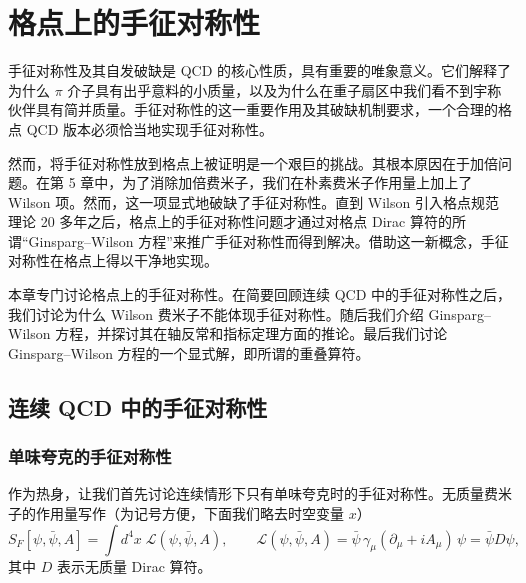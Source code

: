 
\chapter{格点上的手征对称性}

手征对称性及其自发破缺是 QCD 的核心性质，具有重要的唯象意义。它们解释了为什么 $\pi$ 介子具有出乎意料的小质量，以及为什么在重子扇区中我们看不到宇称伙伴具有简并质量。手征对称性的这一重要作用及其破缺机制要求，一个合理的格点 QCD 版本必须恰当地实现手征对称性。

然而，将手征对称性放到格点上被证明是一个艰巨的挑战。其根本原因在于加倍问题。在第 5 章中，为了消除加倍费米子，我们在朴素费米子作用量上加上了 Wilson 项。然而，这一项显式地破缺了手征对称性。直到 Wilson 引入格点规范理论 20 多年之后，格点上的手征对称性问题才通过对格点 Dirac 算符的所谓``Ginsparg--Wilson 方程''来推广手征对称性而得到解决。借助这一新概念，手征对称性在格点上得以干净地实现。

本章专门讨论格点上的手征对称性。在简要回顾连续 QCD 中的手征对称性之后，我们讨论为什么 Wilson 费米子不能体现手征对称性。随后我们介绍 Ginsparg--Wilson 方程，并探讨其在轴反常和指标定理方面的推论。最后我们讨论 Ginsparg--Wilson 方程的一个显式解，即所谓的重叠算符。

\section{连续 QCD 中的手征对称性}

\subsection{单味夸克的手征对称性}

作为热身，让我们首先讨论连续情形下只有单味夸克时的手征对称性。无质量费米子的作用量写作（为记号方便，下面我们略去时空变量 $x$）
\begin{equation}
  S_F[\psi,\bar\psi,A] = \int d^4x\;\mathcal{L}(\psi,\bar\psi,A),
  \qquad
  \mathcal{L}(\psi,\bar\psi,A) = \bar\psi\,\gamma_\mu(\partial_\mu + iA_\mu)\,\psi
  = \bar\psi D\psi,
\end{equation}
其中 $D$ 表示无质量 Dirac 算符。

